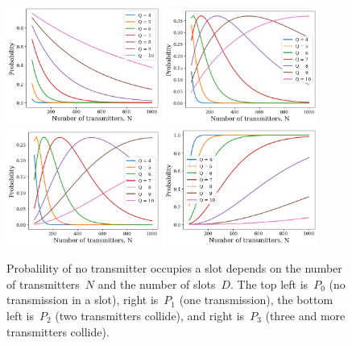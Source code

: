 \documentclass[12pt]{article}
\begin{document}
\begin{figure}[!tb]
\centering
\includegraphics[width=0.45\textwidth]{fig_P0}
\includegraphics[width=0.45\textwidth]{fig_P1}\\
\includegraphics[width=0.45\textwidth]{fig_P2}
\includegraphics[width=0.45\textwidth]{fig_P3}\\
\caption{Probalility of no transmitter occupies a slot depends on the number of transmitters~$N$ and the number of slots~$D$. The top left is~$P_0$ (no transmission in a slot), right is~$P_1$ (one transmission), the bottom left is~$P_2$ (two transmitters collide), and right is~$P_3$ (three and more transmitters collide).}
\label{fig:pr_p0}
\end{figure}
\end{document}

